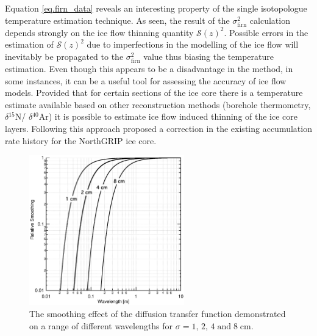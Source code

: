 \documentclass[11pt, draftcls, onecolumn]{IEEEtran} %
\numberwithin{equation}{section}
\numberwithin{table}{section}
\numberwithin{figure}{section}
\newcommand{\delN}{$\delta{}^{15}\mathrm{N}$}
\newcommand{\delAr}{$\delta{}^{40}\mathrm{Ar}$}
\begin{document}
Equation \ref{eq.firn_data} reveals an interesting property of the single isotopologue temperature estimation
technique. As seen, the result of the $\sigma^2_{\mathrm{firn}}$ calculation depends strongly on the 
ice flow thinning quantity $\mathcal{S}(z)^2$. Possible errors in the estimation of $\mathcal{S}(z)^2$ due to imperfections
in the modelling of the ice flow will inevitably be propagated to the $\sigma^2_{\mathrm{firn}}$ value
thus biasing the temperature estimation. Even though this appears to be a disadvantage in the method,
in some instances, it can be a useful tool for assessing the accuracy of ice flow models. 
Provided that for certain sections of the ice core there is a temperature estimate available based on 
other reconstruction methods  (borehole thermometry, \delN / \delAr) it is possible to estimate 
ice flow induced thinning of the ice core layers. Following this approach \cite{Gkinis2014} proposed
a correction in the existing accumulation rate history for the NorthGRIP ice core.


\begin{figure}[]
	\vspace*{2mm}
	\begin{center}
		\includegraphics[width=0.6\textwidth]{Figure_3}
		\caption{The smoothing effect of the diffusion transfer function demonstrated on 
			a range of different wavelengths for $\sigma = 1,\, 2,\, 4\; \mathrm{and} \;8 \;	\mathrm{cm}$.} 
		\label{fig:transfer_function}
	\end{center}
\end{figure}
\end{document}
